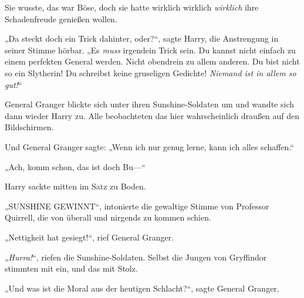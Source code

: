 Sie wusste, das war Böse, doch sie hatte wirklich wirklich \emph{wirklich} ihre Schadenfreude genießen wollen.

„Da steckt doch ein Trick dahinter, oder?“, sagte Harry, die Anstrengung in seiner Stimme hörbar. „Es \emph{muss} irgendein Trick sein. Du kannst nicht einfach zu einem perfekten General werden. Nicht obendrein zu allem anderen. Du bist nicht so ein Slytherin! Du schreibst keine gruseligen Gedichte! \emph{Niemand ist in allem so gut!}“

General Granger blickte sich unter ihren Sunshine-Soldaten um und wandte sich dann wieder Harry zu. Alle beobachteten das hier wahrscheinlich draußen auf den Bildschirmen.

Und General Granger sagte: „Wenn ich nur genug lerne, kann ich alles schaffen.“

„Ach, komm schon, das ist doch Bu—“


Harry sackte mitten im Satz zu Boden.

„SUNSHINE GEWINNT“, intonierte die gewaltige Stimme von Professor Quirrell, die von überall und nirgends zu kommen schien.

„Nettigkeit hat gesiegt!“, rief General Granger.

„\emph{Hurra!}“, riefen die Sunshine-Soldaten. Selbst die Jungen von Gryffindor stimmten mit ein, und das mit Stolz.

„Und was ist die Moral aus der heutigen Schlacht?“, sagte General Granger.

